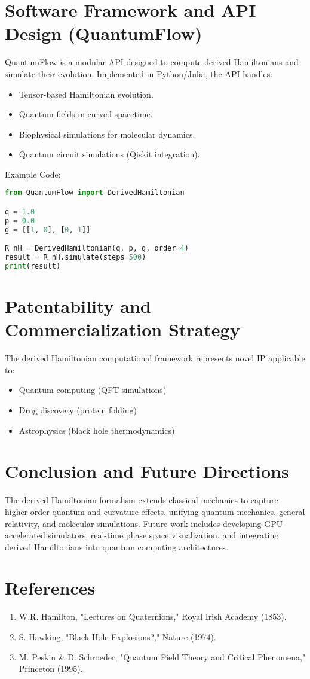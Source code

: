 \documentclass{article}
\begin{document}
\section{Software Framework and API Design (QuantumFlow)}
QuantumFlow is a modular API designed to compute derived Hamiltonians and simulate their evolution. Implemented in Python/Julia, the API handles:
\begin{itemize}
    \item Tensor-based Hamiltonian evolution.
    \item Quantum fields in curved spacetime.
    \item Biophysical simulations for molecular dynamics.
    \item Quantum circuit simulations (Qiskit integration).
\end{itemize}

Example Code:
\begin{lstlisting}[language=Python]
from QuantumFlow import DerivedHamiltonian

q = 1.0
p = 0.0
g = [[1, 0], [0, 1]]

R_nH = DerivedHamiltonian(q, p, g, order=4)
result = R_nH.simulate(steps=500)
print(result)
\end{lstlisting}

\section{Patentability and Commercialization Strategy}
The derived Hamiltonian computational framework represents novel IP applicable to:
\begin{itemize}
    \item Quantum computing (QFT simulations)
    \item Drug discovery (protein folding)
    \item Astrophysics (black hole thermodynamics)
\end{itemize}

\section{Conclusion and Future Directions}
The derived Hamiltonian formalism extends classical mechanics to capture higher-order quantum and curvature effects, unifying quantum mechanics, general relativity, and molecular simulations. Future work includes developing GPU-accelerated simulators, real-time phase space visualization, and integrating derived Hamiltonians into quantum computing architectures.

\section*{References}
\begin{enumerate}
    \item W.R. Hamilton, "Lectures on Quaternions," Royal Irish Academy (1853).
    \item S. Hawking, "Black Hole Explosions?," Nature (1974).
    \item M. Peskin \& D. Schroeder, "Quantum Field Theory and Critical Phenomena," Princeton (1995).
\end{enumerate}
\end{document}
